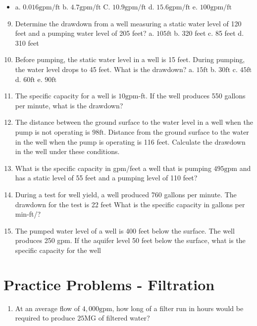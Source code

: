 \documentclass[10pt]{article}
\begin{document}
\begin{enumerate}
\begin{enumerate}
\begin{enumerate}
\end{enumerate}

\begin{itemize}
  \item a. $0.016 \mathrm{gpm} / \mathrm{ft}$
b. $4.7 \mathrm{gpm} / \mathrm{ft}$
C. $10.9 \mathrm{gpm} / \mathrm{ft}$
d. $15.6 \mathrm{gpm} / \mathrm{ft}$
e. $100 \mathrm{gpm} / \mathrm{ft}$
\end{itemize}

\begin{enumerate}
  \setcounter{enumi}{8}
  \item Determine the drawdown from a well measuring a static water level of 120 feet and a pumping water level of 205 feet?
a. $105 \mathrm{ft}$
b. 320 feet
c. 85 feet
d. 310 feet

  \item Before pumping, the static water level in a well is 15 feet. During pumping, the water level drops to 45 feet. What is the drawdown?
a. $15 \mathrm{ft}$
b. $30 \mathrm{ft}$
c. $45 \mathrm{ft}$
d. $60 \mathrm{ft}$
e. $90 \mathrm{ft}$

  \item The specific capacity for a well is $10 \mathrm{gpm}$-ft. If the well produces 550 gallons per minute, what is the drawdown?

  \item The distance between the ground surface to the water level in a well when the pump is not operating is $98 \mathrm{ft}$. Distance from the ground surface to the water in the well when the pump is operating is 116 feet. Calculate the drawdown in the well under these conditions.

  \item What is the specific capacity in gpm/feet a well that is pumping $495 \mathrm{gpm}$ and has a static level of 55 feet and a pumping level of 110 feet?

  \item During a test for well yield, a well produced 760 gallons per minute. The drawdown for the test is 22 feet What is the specific capacity in gallons per min-ft/?

  \item The pumped water level of a well is 400 feet below the surface. The well produces 250 gpm. If the aquifer level 50 feet below the surface, what is the specific capacity for the well

\end{enumerate}

\section{Practice Problems - Filtration}
\begin{enumerate}
  \item At an average flow of $4,000 \mathrm{gpm}$, how long of a filter run in hours would be required to produce $25 \mathrm{MG}$ of filtered water?


\end{enumerate}
\end{enumerate}
\end{enumerate}
\end{document}
